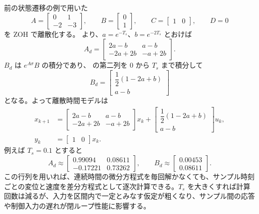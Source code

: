 前の状態遷移の例で用いた
\begin{equation}
  A=\begin{bmatrix}0&1\\-2&-3\end{bmatrix},\qquad
  B=\begin{bmatrix}0\\1\end{bmatrix},\qquad
  C=\begin{bmatrix}1&0\end{bmatrix},\qquad D=0
\end{equation}
を ZOH で離散化する。 より、$a=e^{-T_s}$、$b=e^{-2T_s}$ とおけば
\begin{equation}
  A_d=
  \begin{bmatrix}
    2a-b&a-b\\
    -2a+2b&-a+2b
  \end{bmatrix}.
\end{equation}
$B_d$ は $e^{A\sigma}B$ の積分であり、 の第二列を $0$ から $T_s$ まで積分して
\begin{equation}
  B_d=
  \begin{bmatrix}
    \dfrac{1}{2}(1-2a+b)\\
    a-b
  \end{bmatrix}
\end{equation}
となる。よって離散時間モデルは
\begin{align}
  x_{k+1}
  &=
  \begin{bmatrix}
    2a-b&a-b\\
    -2a+2b&-a+2b
  \end{bmatrix}x_k
  +
  \begin{bmatrix}
    \dfrac{1}{2}(1-2a+b)\\
    a-b
  \end{bmatrix}u_k,\\
  y_k&=\begin{bmatrix}1&0\end{bmatrix}x_k.
\end{align}
例えば $T_s=0.1$ とすると
\begin{equation}
  A_d\approx
  \begin{bmatrix}
    0.99094&0.08611\\
    -0.17221&0.73262
  \end{bmatrix},\qquad
  B_d\approx
  \begin{bmatrix}
    0.00453\\
    0.08611
  \end{bmatrix}.
\end{equation}
この行列を用いれば、連続時間の微分方程式を毎回解かなくても、サンプル時刻ごとの変位と速度を差分方程式として逐次計算できる。$T_s$ を大きくすれば計算回数は減るが、入力を区間内で一定とみなす仮定が粗くなり、サンプル間の応答や制御入力の遅れが閉ループ性能に影響する。

